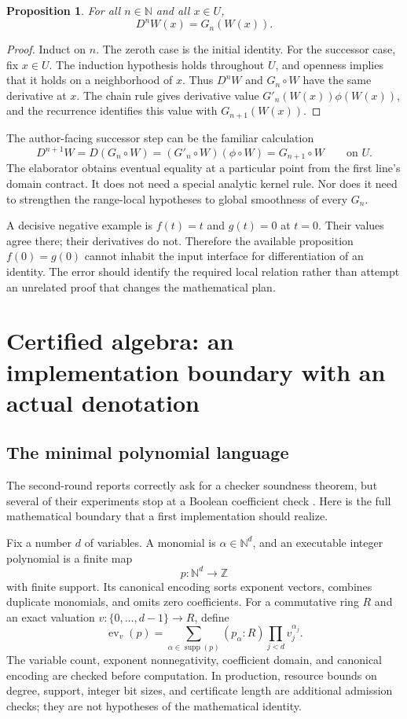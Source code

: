 \documentclass[11pt,a4paper]{article}
\newcommand{\N}{\mathbb N}
\newcommand{\Z}{\mathbb Z}
\newcommand{\ev}{\operatorname{ev}}
\theoremstyle{plain}
\newtheorem{proposition}[theorem]{Proposition}
\theoremstyle{definition}
\begin{document}
\begin{proposition}
For all $n\in\N$ and all $x\in U$,
\[
 D^nW(x)=G_n(W(x)).
\]
\end{proposition}
\begin{proof}
Induct on $n$. The zeroth case is the initial identity. For the successor case, fix $x\in U$. The induction hypothesis holds throughout $U$, and openness implies that it holds on a neighborhood of $x$. Thus $D^nW$ and $G_n\circ W$ have the same derivative at $x$. The chain rule gives derivative value $G'_n(W(x))\phi(W(x))$, and the recurrence identifies this value with $G_{n+1}(W(x))$.
\end{proof}

The author-facing successor step can be the familiar calculation
\[
 D^{n+1}W
   =D(G_n\circ W)
   =(G'_n\circ W)(\phi\circ W)
   =G_{n+1}\circ W
 \qquad\text{on }U.
\]
The elaborator obtains eventual equality at a particular point from the first line's domain contract. It does not need a special analytic kernel rule. Nor does it need to strengthen the range-local hypotheses to global smoothness of every $G_n$.

A decisive negative example is $f(t)=t$ and $g(t)=0$ at $t=0$. Their values agree there; their derivatives do not. Therefore the available proposition $f(0)=g(0)$ cannot inhabit the input interface for differentiation of an identity. The error should identify the required local relation rather than attempt an unrelated proof that changes the mathematical plan.

\section{Certified algebra: an implementation boundary with an actual denotation}\label{sec:cas}

\subsection{The minimal polynomial language}
The second-round reports correctly ask for a checker soundness theorem, but several of their experiments stop at a Boolean coefficient check \cite{synA,synB}. Here is the full mathematical boundary that a first implementation should realize.

Fix a number $d$ of variables. A monomial is $\alpha\in\N^d$, and an executable integer polynomial is a finite map
\[
 p:\N^d\longrightarrow\Z
\]
with finite support. Its canonical encoding sorts exponent vectors, combines duplicate monomials, and omits zero coefficients. For a commutative ring $R$ and an exact valuation $v:\{0,\ldots,d-1\}\to R$, define
\[
 \ev_v(p)=\sum_{\alpha\in\operatorname{supp}(p)}
       (p_\alpha: R)\prod_{j<d}v_j^{\alpha_j}.
\]
The variable count, exponent nonnegativity, coefficient domain, and canonical encoding are checked before computation. In production, resource bounds on degree, support, integer bit sizes, and certificate length are additional admission checks; they are not hypotheses of the mathematical identity.
\end{document}
